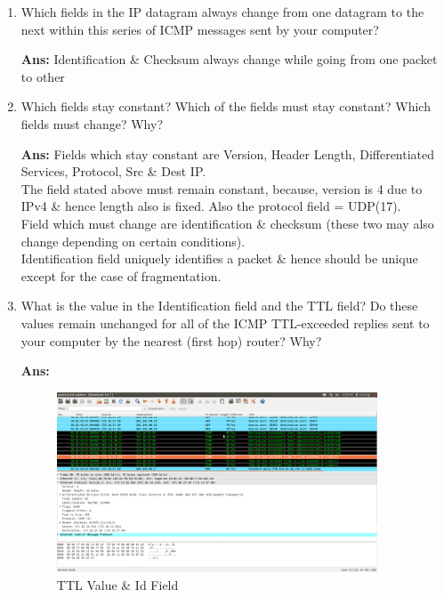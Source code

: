 \documentclass[a4,11pt]{article}
\newenvironment{que}
{ \color{YellowGreen}
  \begin{question}
}
{ \end{question} }
\newenvironment{sol}
{ \color{Black}
  \begin{solution}
}
{ \end{solution} }
\begin{document}
\begin{enumerate}
  \item 
  \begin{que}
   Which fields in the IP datagram always change from one datagram to the next within this series of ICMP messages sent by your computer?
  \end{que}

  \begin{sol}
    \textbf{Ans:} Identification \& Checksum always change while going from one packet to other \\
  \end{sol}
  
  \item
  \begin{que}
    Which fields stay constant? Which of the fields must stay constant? Which fields must change? Why?
  \end{que}

  \begin{sol}
   \textbf{Ans:} 
	Fields which stay constant are Version, Header Length, Differentiated Services, Protocol, Src \& Dest IP. \\
	The field stated above must remain constant, because, version is 4 due to IPv4 \& hence length also is fixed.
	Also the protocol field =  UDP(17). \\
	Field which must change are identification \& checksum (these two may also change depending on certain conditions). \\
	Identification field uniquely identifies a packet \& hence should be unique except for the case of fragmentation.
  \end{sol}

  
  \item
  \begin{que}
   What is the value in the Identification field and the TTL field? 
   Do these values remain unchanged for all of the ICMP TTL-exceeded replies sent to your computer by the nearest (first hop) router? Why?
  \end{que}

  \begin{sol}
  \textbf{Ans:}  
  
   \begin{figure}[h!]
      \includegraphics[width=0.9\textwidth]{ttl-values.png}
          \caption{TTL Value \& Id Field}
          \label{TTL}
  \end{figure}
  

\end{sol}
\end{enumerate}
\end{document}

